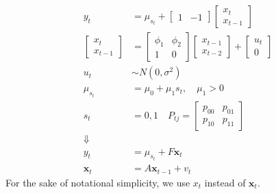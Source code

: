 \documentclass[UTF8,12pt]{ctexart}
\numberwithin{equation}{section}%
\begin{document}
	$$
	\begin{aligned}
		y_t & =\mu_{s_t}+\left[\begin{array}{ll}
			1 & -1
		\end{array}\right]\left[\begin{array}{c}
			x_t \\
			x_{t-1}
		\end{array}\right] \\
		{\left[\begin{array}{c}
				x_t \\
				x_{t-1}
			\end{array}\right] } & =\left[\begin{array}{cc}
			\phi_1 & \phi_2 \\
			1 & 0
		\end{array}\right]\left[\begin{array}{c}
			x_{t-1} \\
			x_{t-2}
		\end{array}\right]+\left[\begin{array}{c}
			u_t \\
			0
		\end{array}\right] \\
		u_t & \sim N\left(0, \sigma^2\right) \\
		\mu_{s_t} & =\mu_0+\mu_1 s_t, \quad \mu_1>0 \\
		s_t & =0,1 \quad P_{t j}=\left[\begin{array}{ll}
			p_{00} & p_{01} \\
			p_{10} & p_{11}
		\end{array}\right] \\
		\Downarrow & \\
		y_t & =\mu_{s_t}+F \mathbf{x}_t \\
		\mathbf{x}_t & =A \mathbf{x}_{t-1}+v_t
	\end{aligned}
	$$
	For the sake of notational simplicity, we use $x_t$ instead of $\mathbf{x}_t$.
	
\end{document}

